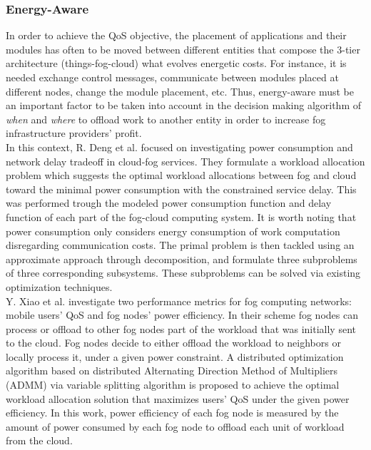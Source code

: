 \subsubsection{Energy-Aware}\label{EnergyAware}
\noindent In order to achieve the QoS objective, the placement of applications and their modules has often to be moved between different entities that compose the 3-tier architecture (things-fog-cloud) what evolves energetic costs. For instance, it is needed exchange control messages, communicate between modules placed at different nodes, change the module placement, etc. Thus, energy-aware must be an important factor to be taken into account in the decision making algorithm of \textit{when} and \textit{where} to offload work to another entity in order to increase fog infrastructure providers' profit.\\
\noindent\tab In this context, R. Deng et al. \cite{deng2016optimal} focused on investigating power consumption and network delay tradeoff in cloud-fog services. They formulate a workload allocation problem which suggests the optimal workload allocations between fog and cloud toward the minimal power consumption with the constrained service delay. This was performed trough the modeled power consumption function and delay function of each part of the fog-cloud computing system. It is worth noting that power consumption only considers energy consumption of work computation disregarding communication costs. The primal problem is then tackled using an approximate approach through decomposition, and formulate three subproblems of three corresponding subsystems. These subproblems can be solved via existing optimization techniques. \\
\noindent\tab Y. Xiao et al. \cite{xiao2017qoe} investigate two performance metrics for fog computing networks: mobile users’ QoS and fog nodes’ power efficiency. In their scheme fog nodes can process or offload to other fog nodes part of the workload that was initially sent to the cloud. Fog nodes decide to either offload the workload to neighbors or locally process it, under a given power constraint. A distributed optimization algorithm based on distributed Alternating Direction Method of Multipliers (ADMM) via variable splitting algorithm is proposed to achieve the optimal workload allocation solution that maximizes users’ QoS under the given power efficiency. In this work, power efficiency of each fog node is measured by the amount of power consumed by each fog node to offload each unit of workload from the cloud.\\
